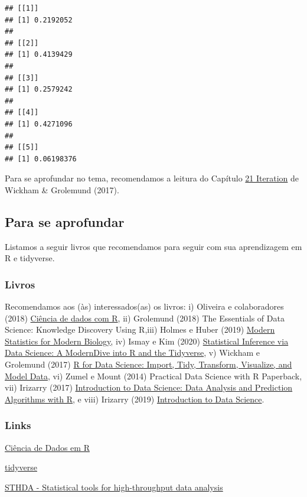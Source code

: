 \documentclass[
]{article}
\begin{document}
\begin{verbatim}
## [[1]]
## [1] 0.2192052
## 
## [[2]]
## [1] 0.4139429
## 
## [[3]]
## [1] 0.2579242
## 
## [[4]]
## [1] 0.4271096
## 
## [[5]]
## [1] 0.06198376
\end{verbatim}

Para se aprofundar no tema, recomendamos a leitura do Capítulo \href{https://r4ds.had.co.nz/iteration.html}{21 Iteration} de Wickham \& Grolemund (2017).

\hypertarget{para-se-aprofundar-1}{%
\subsection{Para se aprofundar}\label{para-se-aprofundar-1}}

Listamos a seguir livros que recomendamos para seguir com sua aprendizagem em R e tidyverse.

\hypertarget{livros-1}{%
\subsubsection{Livros}\label{livros-1}}

Recomendamos aos (às) interessados(as) os livros: i) Oliveira e colaboradores (2018) \href{https://cdr.ibpad.com.br/}{Ciência de dados com R}, ii) Grolemund (2018) The Essentials of Data Science: Knowledge Discovery Using R,iii) Holmes e Huber (2019) \href{https://www.huber.embl.de/msmb/}{Modern Statistics for Modern Biology}, iv) Ismay e Kim (2020) \href{https://moderndive.com/}{Statistical Inference via Data Science: A ModernDive into R and the Tidyverse}, v) Wickham e Grolemund (2017) \href{https://r4ds.had.co.nz/}{R for Data Science: Import, Tidy, Transform, Visualize, and Model Data}, vi) Zumel e Mount (2014) Practical Data Science with R Paperback, vii) Irizarry (2017) \href{https://leanpub.com/dataanalysisforthelifesciences}{Introduction to Data Science: Data Analysis and Prediction Algorithms with R}, e viii) Irizarry (2019) \href{https://rafalab.github.io/dsbook/}{Introduction to Data Science}.

\hypertarget{links-1}{%
\subsubsection{Links}\label{links-1}}

\href{https://livro.curso-r.com/}{Ciência de Dados em R}

\href{https://www.tidyverse.org/}{tidyverse}

\href{http://www.sthda.com/english/}{STHDA - Statistical tools for high-throughput data analysis}
\end{document}
